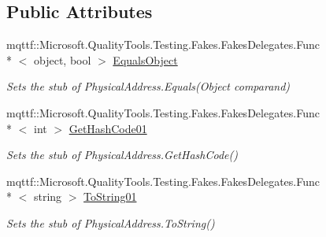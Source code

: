 \subsection*{Public Attributes}
\begin{DoxyCompactItemize}
\item 
mqttf\-::\-Microsoft.\-Quality\-Tools.\-Testing.\-Fakes.\-Fakes\-Delegates.\-Func\\*
$<$ object, bool $>$ \hyperlink{class_system_1_1_net_1_1_network_information_1_1_fakes_1_1_stub_physical_address_a016ee9a7cecf8207f4b0a7b9965fcd8c}{Equals\-Object}
\begin{DoxyCompactList}\small\item\em Sets the stub of Physical\-Address.\-Equals(\-Object comparand)\end{DoxyCompactList}\item 
mqttf\-::\-Microsoft.\-Quality\-Tools.\-Testing.\-Fakes.\-Fakes\-Delegates.\-Func\\*
$<$ int $>$ \hyperlink{class_system_1_1_net_1_1_network_information_1_1_fakes_1_1_stub_physical_address_aa637f4d6efafca0a34340c9e1d7a9bb9}{Get\-Hash\-Code01}
\begin{DoxyCompactList}\small\item\em Sets the stub of Physical\-Address.\-Get\-Hash\-Code()\end{DoxyCompactList}\item 
mqttf\-::\-Microsoft.\-Quality\-Tools.\-Testing.\-Fakes.\-Fakes\-Delegates.\-Func\\*
$<$ string $>$ \hyperlink{class_system_1_1_net_1_1_network_information_1_1_fakes_1_1_stub_physical_address_aa7a39dff545ec59cce38c7dbc9a05e52}{To\-String01}
\begin{DoxyCompactList}\small\item\em Sets the stub of Physical\-Address.\-To\-String()\end{DoxyCompactList}\end{DoxyCompactItemize}
